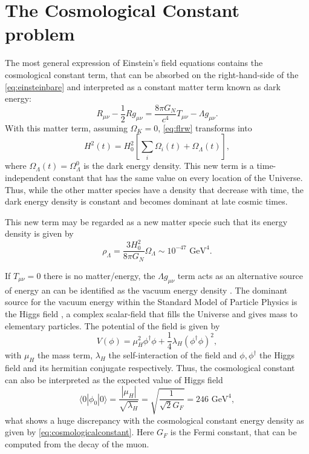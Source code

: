 \section{The Cosmological Constant problem}
The most general expression of Einstein's field equations contains the cosmological constant term, that can be absorbed on the right-hand-side of the \autoref{eq:einsteinbare} and interpreted as a constant matter term known as dark energy:
\begin{equation}
R_{\mu\nu}-\frac{1}{2}Rg_{\mu\nu} = \frac{8\pi G_N}{c^4}T_{\mu\nu}-\Lambda g_{\mu\nu}.
\end{equation}
With this matter term, assuming $\Omega_K=0$, \autoref{eq:flrw} transforms into
\begin{equation}
H^2(t) = H_0^2\left[\sum_i\Omega_i(t) +\Omega_\Lambda(t)\right],
\end{equation}
where $\Omega_\Lambda(t)=\Omega_\Lambda^0$ is the dark energy density. This new term is a time-independent constant that has the same value on every location of the Universe. Thus, while the other matter species have a density that decrease with time, the dark energy density is constant and becomes dominant at late cosmic times.
\newline

This new term may be regarded as a new matter specie such that its energy density is given by
\begin{equation}
\rho_\Lambda = \frac{3H_0^2}{8\pi G_N}\Omega_\Lambda\sim 10 ^{-47} \mbox{ GeV}^4.
\label{eq:cosmologicalconstant}
\end{equation}
\newline

If $T_{\mu\nu}=0$ there is no matter/energy, the $\Lambda g_{\mu\nu}$ term acts as an alternative source of energy an can be identified as the vacuum energy density \cite{0038-5670-11-3-A13,RevModPhys.61.1,2003PhR...380..235P,PhysRevD.72.021301}. The dominant source for the vacuum energy within the Standard Model of Particle Physics is the Higgs field \cite{1974JETPL..19..183L,PhysRevLett.34.777}, a complex scalar-field that fills the Universe and gives mass to elementary particles. The potential of the field is given by
\begin{equation}
V(\phi) = \mu_H^2\phi^\dagger\phi+\frac{1}{4}\lambda_H(\phi^\dagger\phi)^2,
\end{equation}
with $\mu_H$ the mass term, $\lambda_H$ the self-interaction of the field and $\phi,\phi^\dagger$ the Higgs field and its hermitian conjugate respectively. Thus, the cosmological constant can also be interpreted as the expected value of Higgs field \cite{1974JETPL..19..183L,PhysRevLett.34.777}
\begin{equation}
\langle 0|\phi_0|0\rangle = \frac{|\mu_H|}{\sqrt{\lambda_H}}= \sqrt{\frac{1}{\sqrt{2}G_F}}= 246\mbox{ GeV}^4,
\end{equation}
what shows a huge discrepancy with the cosmological constant energy density as given by \autoref{eq:cosmologicalconstant}. Here $G_F$ is the Fermi constant, that can be computed from the decay of the muon.

